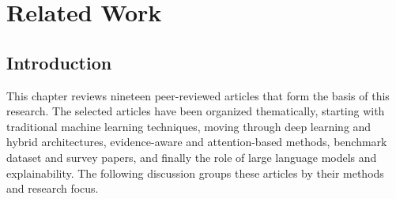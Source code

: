 \sloppy
\chapter{Related Work}
\section{Introduction}

This chapter reviews nineteen peer-reviewed articles that form the basis of this research. The selected articles have been organized thematically, starting with traditional machine learning techniques, moving through deep learning and hybrid architectures, evidence-aware and attention-based methods, benchmark dataset and survey papers, and finally the role of large language models and explainability. The following discussion groups these articles by their methods and research focus.

